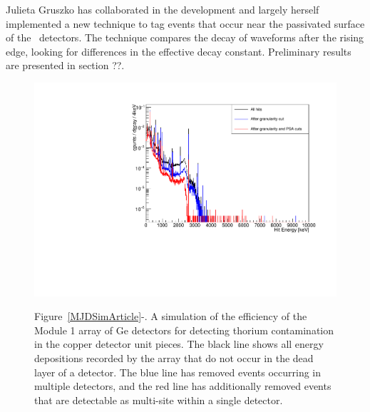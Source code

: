 Julieta Gruszko has collaborated in the development and largely herself implemented a new technique to tag events that occur near the passivated surface of the \MJ\ detectors. The technique compares the decay of waveforms after the rising edge, looking for differences in the effective decay constant. Preliminary results are presented in section ??.

\begin{figure}
\begin{center}
\hfil  \includegraphics[width=.48\textwidth]{M1DUThCombined.pdf} \hfil 

\end{center}
 \hfil \parbox{.5\textwidth}{\small Figure~\ref{MJDSimArticle}-. A simulation of the efficiency of the Module 1 array of Ge detectors for detecting thorium contamination in the copper detector unit pieces. The black line shows all energy depositions recorded by the array that do not occur in the dead layer of a detector. The blue line has removed events occurring in multiple detectors, and the red line has additionally removed events that are detectable as multi-site within a single detector. }  \hfil

\label{sim}  %

\end{figure}

